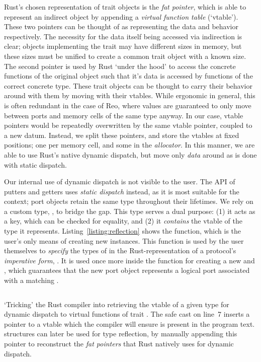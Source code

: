 Rust's chosen representation of trait objects is the \textit{fat pointer}, which is able to represent an indirect object by appending a \textit{virtual function table} (`vtable'). These two pointers can be thought of as representing the data and behavior respectively. The necessity for the data itself being accessed via indirection is clear; objects implementing the trait may have different sizes in memory, but these sizes must be unified to create a common trait object with a known size. The second pointer is used by Rust `under the hood' to access the concrete functions of the original object such that it's data is accessed by functions of the correct concrete type. These trait objects can be thought to carry their behavior around with them by moving with their vtables. While ergonomic in general, this is often redundant in the case of Reo, where values are guaranteed to only move between ports and memory cells of the same type anyway. In our case, vtable pointers would be repeatedly overwritten by the same vtable pointer, coupled to a new datum. Instead, we split these pointers, and store the vtables at fixed positions; one per memory cell, and some in the \textit{allocator}. In this manner, we are able to use Rust's native dynamic dispatch, but move only \textit{data} around as is done with static dispatch. 

Our internal use of dynamic dispatch is not visible to the user. The API of putters and getters uses \textit{static dispatch} instead, as it is most suitable for the context; port objects retain the same type throughout their lifetimes. We rely on a custom type, , to bridge the gap. This type serves a dual purpose: (1) it acts as a key, which can be checked for equality, and (2) it \textit{contains} the vtable of the type it represents. Listing~\ref{listing:reflection} shows the  function, which is the user's only means of creating new  instances. This function is used by the user themselves to \textit{specify} the types of in the Rust-representation of a protocol's \textit{imperative form}, . It is used once more inside the  function for creating a new  and , which guarantees that the new port object represents a logical port associated with a matching .



\begin{listing}[ht]
	\centering
	\inputminted{rust}{reflection.rs}
	\caption[Tricking Rust into exposing a vtable.]{`Tricking' the Rust compiler into retrieving the vtable of a given type  for dynamic dispatch to virtual functions of trait . The safe cast on line~7 inserts a pointer to a vtable which the compiler will ensure is present in the program text.  structures can later be used for type reflection, by manually appending this pointer to reconstruct the \textit{fat pointers} that Rust natively uses for dynamic dispatch.}
	\label{listing:reflection}
\end{listing}

